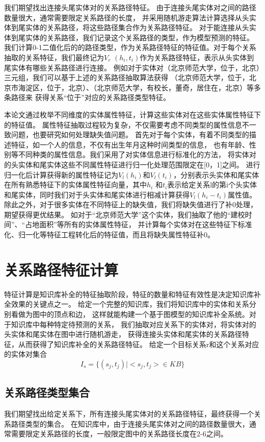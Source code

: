我们期望找出连接头尾实体对的关系路径特征。
由于连接头尾实体对之间的路径数量很大，通常需要限定关系路径的长度，
并采用随机游走算法计算选择从头实体到尾实体的关系路径，将这些路径集合作为关系路径特征。
对于能连接从头实体到尾实体的关系路径，我们记录这个关系路径的类型，作为模型预测的特征。
我们计算0-1二值化后的的路径类型，作为关系路径特征的特征值。对于每个关系抽取的关系特征，我们最终记为$V_r$ $(h_i,t_i)$作为关系路径特征，表示从头实体到尾实体有哪些关系路径进行连接。
例如对于实体对（北京师范大学，位于，北京）三元组，我们可以基于上述的关系路径抽取算法获得
（北京师范大学，位于，北京市海淀区，位于，北京）、（北京师范大学，有校长，董奇，居住在，北京）等多条路径来
获得关系“位于”对应的关系路径类型特征。

本论文通过枚举不同维度的实体属性特征，计算这些实体对在这些实体属性特征下的特征值。
属性特征抽取过程较为复杂，不仅需要考虑不同类型的属性信息不一致问题，也要研究如何处理缺失值问题。
首先对于每个实体，有着不同类型的描述特征，如一个人的信息，不仅有出生年月这种时间类型的信息，
也有年龄、性别等不同种类的属性信息。我们采用了对实体信息进行标准化的方法，
将实体对的头实体和尾实体这些不同属性特征进行归一化处理范围限定在[0，1]之间。
进行归一化后计算获得新的属性特征记为$V_l(h_i)$和$V_l (t_i)$，分别表示头实体和尾实体在所有熟悉特征下的实体属性特征向量，其中$h_i$ 和$t_i$表示给定关系l的第i个头实体和尾实体，同时我们对于头实体和尾实体进行相减计算获得$V_l(h_i-t_i )$属性值。除此之外，对于很多实体在不同特征上的缺失值，我们将缺失值进行了补0处理，期望获得更优结果。
如对于“北京师范大学”这个实体，我们抽取了他的“建校时间”、“占地面积”等所有的实体属性特征，
并计算每个实体对在这些特征下标准化、归一化等特征工程转化后的特征值，而且将缺失属性特征补0。

\section{关系路径特征计算}
\label{sec:relational-compute}
特征计算是知识库补全的特征抽取阶段，特征的数量和特征有效性是决定知识库补全效果的关键点之一。
给定一个完整的知识库，我们将知识库中的实体和关系分别看做为图中的顶点和边，
这样就能构建一个基于图模型的知识库补全系统。对于知识库中每种特定待预测的关系，
我们抽取对应关系下的实体对，将实体对的头实体和尾实体在图中进行随机游走\cite{Lao2012}，
获得连接头实体和尾实体的关系路径特征，从而获得了知识库补全的关系路径特征。
给定一个目标关系r和这个关系对应的实体对集合
$$I_s=\{(s_j,t_j)|<s_j,t_j> \in KB\}$$


\subsection{关系路径类型集合}
\label{sec:relational-set}
我们期望找出给定关系下，所有连接头尾实体对的关系路径特征，最终获得一个关系路径类型的集合。
在知识库中，由于连接头尾实体对之间的路径数量很大，通常需要限定关系路径的长度，一般限定图中的关系路径长度在2-6之间。

